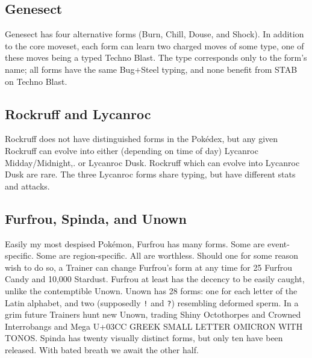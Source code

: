 \subsection{Genesect\label{subsec:genesect}}
Genesect has four alternative forms (Burn, Chill, Douse, and Shock).
In addition to the core moveset, each form can learn two charged moves of some type,
one of these moves being a typed Techno Blast.
The type corresponds only to the form's name; all forms have the same Bug+Steel typing,
 and none benefit from STAB on Techno Blast.

\subsection{Rockruff and Lycanroc\label{subsec:rockruff}}
Rockruff does not have distinguished forms in the Pokédex, but any given Rockruff
 can evolve into either (depending on time of day) Lycanroc Midday/Midnight,.
 or Lycanroc Dusk.
Rockruff which can evolve into Lycanroc Dusk are rare.
The three Lycanroc forms share typing, but have different stats and attacks.

\subsection{Furfrou, Spinda, and Unown\label{subsec:furfrou}}
Easily my most despised Pokémon, Furfrou has many forms.
Some are event-specific.
Some are region-specific.
All are worthless.
Should one for some reason wish to do so, a Trainer can change Furfrou's form
  at any time for 25 Furfrou Candy and 10,000 Stardust.
Furfrou at least has the decency to be easily caught, unlike the contemptible Unown.
Unown has 28 forms: one for each letter of the Latin alphabet, and two
  (supposedly \texttt{!} and \texttt{?}) resembling deformed sperm.
In a grim future Trainers hunt new Unown, trading Shiny Octothorpes and
  Crowned Interrobangs and Mega U+03CC GREEK SMALL LETTER OMICRON WITH TONOS\@.
Spinda has twenty visually distinct forms, but only ten have been released.
With bated breath we await the other half.
